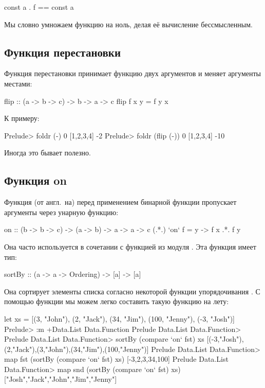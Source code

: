 \begin{code}
const a  .  f  == const a
\end{code}

Мы словно умножаем функцию на ноль, делая 
её вычисление бессмысленным. 

\subsection{Функция перестановки}

Функция перестановки  принимает функцию
двух аргументов и меняет аргументы местами:

\begin{code}
flip  :: (a -> b -> c) -> b -> a -> c
flip f x y = f y x
\end{code}

К примеру:

\begin{code}
Prelude> foldr (-) 0 [1,2,3,4]
-2
Prelude> foldr (flip (-)) 0 [1,2,3,4]
-10
\end{code}

Иногда это бывает полезно.

\subsection{Функция on}

Функция  (от англ.~на) перед применением бинарной
функции пропускает аргументы через унарную функцию:

\begin{code}
on :: (b -> b -> c) -> (a -> b) -> a -> a -> c
(.*.) `on` f = \x y -> f x .*. f y
\end{code}

Она часто используется в сочетании с функцией 
из модуля . Эта функция имеет тип:

\begin{code}
sortBy :: (a -> a -> Ordering) -> [a] -> [a]
\end{code}

Она сортирует элементы списка согласно некоторой
функции упорядочивания .
С помощью функции  мы можем легко составить такую
функцию на лету:

\begin{code}
let xs = [(3, "John"), (2, "Jack"), (34, "Jim"), (100, "Jenny"), (-3, "Josh")]  
Prelude> :m +Data.List Data.Function
Prelude Data.List Data.Function> 
Prelude Data.List Data.Function> sortBy (compare `on` fst) xs
[(-3,"Josh"),(2,"Jack"),(3,"John"),(34,"Jim"),(100,"Jenny")]
Prelude Data.List Data.Function> map fst (sortBy (compare `on` fst) xs)
[-3,2,3,34,100]
Prelude Data.List Data.Function> map snd (sortBy (compare `on` fst) xs)
["Josh","Jack","John","Jim","Jenny"]
\end{code}

